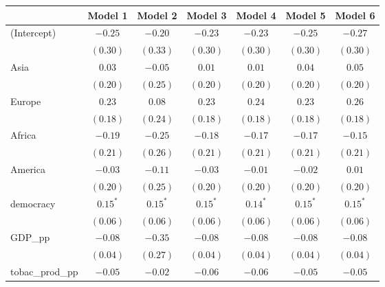 
\begin{table}[!h]
\begin{center}
\begin{tabular}{l c c c c c c }
\toprule
 & Model 1 & Model 2 & Model 3 & Model 4 & Model 5 & Model 6 \\
\midrule
(Intercept)             & $-0.25$      & $-0.20$      & $-0.23$      & $-0.23$      & $-0.25$      & $-0.27$      \\
                        & $(0.30)$     & $(0.33)$     & $(0.30)$     & $(0.30)$     & $(0.30)$     & $(0.30)$     \\
Asia                    & $0.03$       & $-0.05$      & $0.01$       & $0.01$       & $0.04$       & $0.05$       \\
                        & $(0.20)$     & $(0.25)$     & $(0.20)$     & $(0.20)$     & $(0.20)$     & $(0.20)$     \\
Europe                  & $0.23$       & $0.08$       & $0.23$       & $0.24$       & $0.23$       & $0.26$       \\
                        & $(0.18)$     & $(0.24)$     & $(0.18)$     & $(0.18)$     & $(0.18)$     & $(0.18)$     \\
Africa                  & $-0.19$      & $-0.25$      & $-0.18$      & $-0.17$      & $-0.17$      & $-0.15$      \\
                        & $(0.21)$     & $(0.26)$     & $(0.21)$     & $(0.21)$     & $(0.21)$     & $(0.21)$     \\
America                 & $-0.03$      & $-0.11$      & $-0.03$      & $-0.01$      & $-0.02$      & $0.01$       \\
                        & $(0.20)$     & $(0.25)$     & $(0.20)$     & $(0.20)$     & $(0.20)$     & $(0.20)$     \\
democracy               & $0.15^{*}$   & $0.15^{*}$   & $0.15^{*}$   & $0.14^{*}$   & $0.15^{*}$   & $0.15^{*}$   \\
                        & $(0.06)$     & $(0.06)$     & $(0.06)$     & $(0.06)$     & $(0.06)$     & $(0.06)$     \\
GDP\_pp                 & $-0.08$      & $-0.35$      & $-0.08$      & $-0.08$      & $-0.08$      & $-0.08$      \\
                        & $(0.04)$     & $(0.27)$     & $(0.04)$     & $(0.04)$     & $(0.04)$     & $(0.04)$     \\
tobac\_prod\_pp         & $-0.05$      & $-0.02$      & $-0.06$      & $-0.06$      & $-0.05$      & $-0.05$      \\

\end{tabular}
\end{center}
\end{table}
